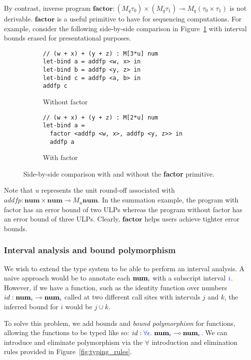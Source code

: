 By contrast, inverse program $\textbf{factor}: (M_q \tau_0) \times (M_q \tau_1)
\multimap M_q (\tau_0 \times \tau_1)$ is not derivable. $\textbf{factor}$ is a
useful primitive to have for sequencing computations. For example, consider the
following side-by-side comparison in Figure~\ref{fig:factor-side-by-side} with
interval bounds erased for presentational purposes.

\begin{figure}[ht]
\centering

\begin{subfigure}[t]{0.48\textwidth}
\begin{lstlisting}
// (w + x) + (y + z) : M[3*u] num 
let-bind a = addfp <w, x> in
let-bind b = addfp <y, z> in
let-bind c = addfp <a, b> in
addfp c 
\end{lstlisting}
\caption{Without factor}
\end{subfigure}
\hfill
\begin{subfigure}[t]{0.48\textwidth}
\begin{lstlisting}
// (w + x) + (y + z) : M[2*u] num 
let-bind a = 
  factor <addfp <w, x>, addfp <y, z>> in
  addfp a
\end{lstlisting}
\caption{With factor}
\end{subfigure}

\caption{Side-by-side comparison with and without the \textbf{factor} primitive.}
\label{fig:factor-side-by-side}
\end{figure}
Note that $u$ represents the unit round-off associated with $addfp :
\textbf{num} \times \textbf{num} \multimap M_u \textbf{num}$. In the summation
example, the program with factor has an error bound of two ULPs whereas the
program without factor has an error bound of three ULPs. Clearly,
$\textbf{factor}$ helps users achieve tighter error bounds.

\subsubsection*{Interval analysis and bound polymorphism}
We wish to extend the type system to be able to perform an interval analysis. A
naive approach would be to annotate each $\textbf{num}_{\textcolor{blue}{i}}$ with a
subscript interval $\textcolor{blue}{i}$. However, if we have a function, such as the
identity function over numbers $id : \textbf{num}_{\textcolor{blue}{i}} \multimap
\textbf{num}_{\textcolor{blue}{i}}$ called at two different call sites with intervals $j$
and $k$, the inferred bound for $i$ would be $j \cup k$.

To solve this problem, we add bounds and \textit{bound polymorphism} for
functions, allowing the functions to be typed like so: $id : \textcolor{blue}{\forall
\epsilon.} ~ \textbf{num}_{\textcolor{blue}{\epsilon}} \multimap
\textbf{num}_{\textcolor{blue}{\epsilon}}$. We can introduce and eliminate polymorphism via
the $\forall$ introduction and elimination rules provided in
Figure~\ref{fig:typing_rules}.

